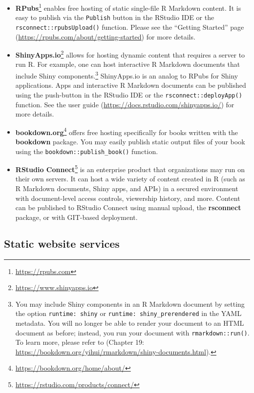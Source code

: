 \documentclass[
  11pt,
]{krantz}
\renewcommand{\href}[2]{#2\footnote{\url{#1}}}
\begin{document}
\begin{itemize}
\item
  \href{https://rpubs.com}{\textbf{RPubs}} enables free hosting of static single-file R Markdown content. It is easy to publish via the \texttt{Publish} button in the RStudio IDE or the \texttt{rsconnect::rpubsUpload()} function. Please see the ``Getting Started'' page (\url{https://rpubs.com/about/getting-started}) for more details.
\item
  \href{https://www.shinyapps.io}{\textbf{ShinyApps.io}} allows for hosting dynamic content that requires a server to run R. For example, one can host interactive R Markdown documents that include Shiny components.\footnote{You may include Shiny components in an R Markdown document by setting the option \texttt{runtime:\ shiny} or \texttt{runtime:\ shiny\_prerendered} in the YAML metadata. You will no longer be able to render your document to an HTML document as before; instead, you run your document with \texttt{rmarkdown::run()}. To learn more, please refer to \citet{rmarkdown2018} (Chapter 19: \url{https://bookdown.org/yihui/rmarkdown/shiny-documents.html}).} ShinyApps.io is an analog to RPubs for Shiny applications. Apps and interactive R Markdown documents can be published using the push-button in the RStudio IDE or the \texttt{rsconnect::deployApp()} function. See the user guide (\url{https://docs.rstudio.com/shinyapps.io/}) for more details.
\item
  \href{https://bookdown.org/home/about/}{\textbf{bookdown.org}} offers free hosting specifically for books written with the \textbf{bookdown} package. You may easily publish static output files of your book using the \texttt{bookdown::publish\_book()} function.
\item
  \href{https://rstudio.com/products/connect/}{\textbf{RStudio Connect}} is an enterprise product that organizations may run on their own servers. It can host a wide variety of content created in R (such as R Markdown documents, Shiny apps, and APIs) in a secured environment with document-level access controls, viewership history, and more. Content can be published to RStudio Connect using manual upload, the \textbf{rsconnect} package, or with GIT-based deployment.
\end{itemize}

\hypertarget{static-website-services}{%
\subsection{Static website services}\label{static-website-services}}
\end{document}
